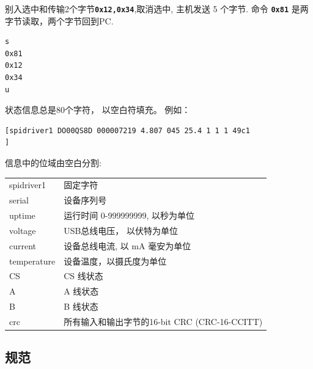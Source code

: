 \documentclass{article}
\newcommand{\mach}[1]{\texttt{\textbf{#1}}}
\newcommand{\gap}{\vspace{10pt}}
\begin{document}
别入选中和传输2个字节\mach{0x12,0x34},取消选中, 主机发送  5 个字节.
命令 \mach{0x81} 是两字节读取，两个字节回到PC.

\begin{lstlisting}
s
0x81
0x12
0x34
u
\end{lstlisting}


状态信息总是80个字符， 以空白符填充。 例如：


{\scriptsize
\begin{framed}\begin{Verbatim}
[spidriver1 DO00QS8D 000007219 4.807 045 25.4 1 1 1 49c1                       ]
\end{Verbatim}
\end{framed}}

信息中的位域由空白分割:

\gap\begin{tabular}{ll}
\hline
spidriver1      & 固定字符 \\
serial          & 设备序列号 \\
uptime          & 运行时间 0-999999999, 以秒为单位 \\
voltage         & USB总线电压， 以伏特为单位 \\
current         & 设备总线电流, 以 mA 毫安为单位 \\
temperature     & 设备温度，以摄氏度为单位 \\
CS              & CS 线状态 \\
A               & A 线状态 \\
B               & B 线状态 \\
crc             & 所有输入和输出字节的16-bit CRC  (CRC-16-CCITT)  \index{CRC}\\
\hline
\end{tabular}\gap

\newpage
\subsection{规范}\label{electrical-characteristics}
\end{document}
